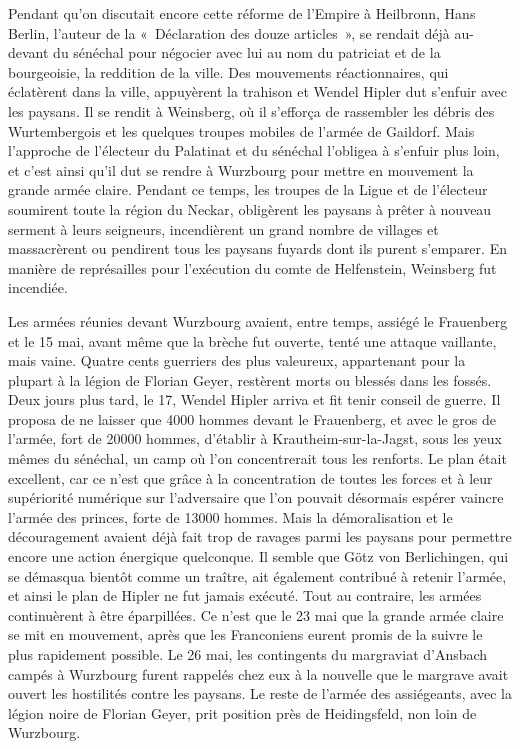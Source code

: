\documentclass[french,twoside]{book} %
\begin{document}
Pendant qu’on discutait encore cette réforme de l’Empire à Heilbronn, Hans Berlin, l’auteur de la « Déclaration des douze articles », se rendait déjà au-devant du sénéchal pour négocier avec lui au nom du patriciat et de la bourgeoisie, la reddition de la ville. Des mouvements réactionnaires, qui éclatèrent dans la ville, appuyèrent la trahison et Wendel Hipler dut s’enfuir avec les paysans. Il se rendit à Weinsberg, où il s’efforça de rassembler les débris des Wurtembergois et les quelques troupes mobiles de l’armée de Gaildorf. Mais l’approche de l’électeur du Palatinat et du sénéchal l’obligea à s’enfuir plus loin, et c’est ainsi qu’il dut se rendre à Wurzbourg pour mettre en mouvement la grande armée claire. Pendant ce temps, les troupes de la Ligue et de l’électeur soumirent toute la région du Neckar, obligèrent les paysans à prêter à nouveau serment à leurs seigneurs, incendièrent un grand nombre de villages et massacrèrent ou pendirent tous les paysans fuyards dont ils purent s’emparer. En manière de représailles pour l’exécution du comte de Helfenstein, Weinsberg fut incendiée.\par
Les armées réunies devant Wurzbourg avaient, entre temps, assiégé le Frauenberg et le 15 mai, avant même que la brèche fut ouverte, tenté une attaque vaillante, mais vaine. Quatre cents guerriers des plus valeureux, appartenant pour la plupart à la légion de Florian Geyer, restèrent morts ou blessés dans les fossés. Deux jours plus tard, le 17, Wendel Hipler arriva et fit tenir conseil de guerre. Il proposa de ne laisser que 4000 hommes devant le Frauenberg, et avec le gros de l’armée, fort de 20000 hommes, d’établir à Krautheim-sur-la-Jagst, sous les yeux mêmes du sénéchal, un camp où l’on concentrerait tous les renforts. Le plan était excellent, car ce n’est que grâce à la concentration de toutes les forces et à leur supériorité numérique sur l’adversaire que l’on pouvait désormais espérer vaincre l’armée des princes, forte de 13000 hommes. Mais la démoralisation et le découragement avaient déjà fait trop de ravages parmi les paysans pour permettre encore une action énergique quelconque. Il semble que Götz von Berlichingen, qui se démasqua bientôt comme un traître, ait également contribué à retenir l’armée, et ainsi le plan de Hipler ne fut jamais exécuté. Tout au contraire, les armées continuèrent à être éparpillées. Ce n’est que le 23 mai que la grande armée claire se mit en mouvement, après que les Franconiens eurent promis de la suivre le plus rapidement possible. Le 26 mai, les contingents du margraviat d’Ansbach campés à Wurzbourg furent rappelés chez eux à la nouvelle que le margrave avait ouvert les hostilités contre les paysans. Le reste de l’armée des assiégeants, avec la légion noire de Florian Geyer, prit position près de Heidingsfeld, non loin de Wurzbourg.\par
\end{document}
